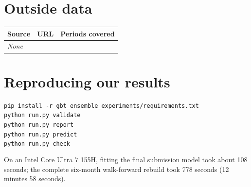 \documentclass[11pt]{article}
\begin{document}
\section*{Outside data}
\begin{tabular}{lll}
\toprule
Source & URL & Periods covered \\
\midrule
\textit{None} & & \\
\bottomrule
\end{tabular}

\section*{Reproducing our results}
\texttt{pip install -r gbt\_ensemble\_experiments/requirements.txt}\\
\texttt{python run.py validate}\\
\texttt{python run.py report}\\
\texttt{python run.py predict}\\
\texttt{python run.py check}

On an Intel Core Ultra 7 155H, fitting the final submission model took about
108 seconds; the complete six-month walk-forward rebuild took 778 seconds
(12 minutes 58 seconds).
\end{document}
